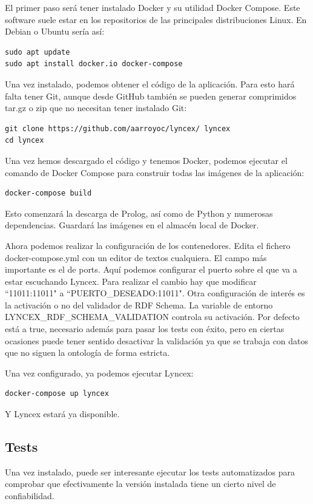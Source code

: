 \documentclass[openright,twoside,12pt]{book}
\begin{document}
El primer paso será tener instalado Docker y su utilidad Docker Compose. Este software suele estar en los repositorios de las principales distribuciones Linux. En Debian o Ubuntu sería así:
\begin{verbatim}
sudo apt update
sudo apt install docker.io docker-compose
\end{verbatim}

Una vez instalado, podemos obtener el código de la aplicación. Para esto hará falta tener Git, aunque desde GitHub también se pueden generar comprimidos tar.gz o zip que no necesitan tener instalado Git:
\begin{verbatim}
git clone https://github.com/aarroyoc/lyncex/ lyncex
cd lyncex
\end{verbatim}

Una vez hemos descargado el código y tenemos Docker, podemos ejecutar el comando de Docker Compose para construir todas las imágenes de la aplicación:
\begin{verbatim}
docker-compose build
\end{verbatim}

Esto comenzará la descarga de Prolog, así como de Python y numerosas dependencias. Guardará las imágenes en el almacén local de Docker. 

Ahora podemos realizar la configuración de los contenedores. Edita el fichero docker-compose.yml con un editor de textos cualquiera. El campo más importante es el de ports. Aquí podemos configurar el puerto sobre el que va a estar escuchando Lyncex. Para realizar el cambio hay que modificar ``11011:11011" a ``PUERTO\_DESEADO:11011". Otra configuración de interés es la activación o no del validador de RDF Schema. La variable de entorno LYNCEX\_RDF\_SCHEMA\_VALIDATION controla su activación. Por defecto está a true, necesario además para pasar los tests con éxito, pero en ciertas ocasiones puede tener sentido desactivar la validación ya que se trabaja con datos que no siguen la ontología de forma estricta.

Una vez configurado, ya podemos ejecutar Lyncex:
\begin{verbatim}
docker-compose up lyncex
\end{verbatim}
Y Lyncex estará ya disponible.

\subsection{Tests}

Una vez instalado, puede ser interesante ejecutar los tests automatizados para comprobar que efectivamente la versión instalada tiene un cierto nivel de confiabilidad.
\end{document}
